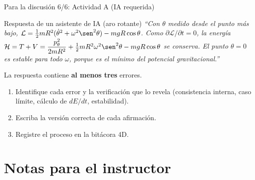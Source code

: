 \documentclass[spanish]{beamer}
\newif\ifinstructor
\newcommand{\Lag}{\mathcal{L}}               %
\newcommand{\Ham}{\mathcal{H}}               %
\begin{document}
\begin{frame}{Para la discusión 6/6: Actividad A (IA requerida)}
\begin{alertblock}{Respuesta de un asistente de IA (aro rotante)}
\small
\textit{“Con $\theta$ medido desde el punto más bajo,
$\Lag=\tfrac12 mR^2(\dot\theta^2+\omega^2\sen^2\theta)-mgR\cos\theta$.
Como $\partial\Lag/\partial t=0$, la energía
$\Ham=T+V=\dfrac{p_\theta^2}{2mR^2}+\tfrac12 mR^2\omega^2\sen^2\theta-mgR\cos\theta$
se conserva. El punto $\theta=0$ es estable para todo $\omega$, porque es el mínimo del
potencial gravitacional.”}
\end{alertblock}
\pause
La respuesta contiene \textbf{al menos tres} errores.
\begin{enumerate}[<+->]
  \item Identifique cada error y la verificación que lo revela
        (consistencia interna, caso límite, cálculo de $dE/dt$, estabilidad).
  \item Escriba la versión correcta de cada afirmación.
  \item Registre el proceso en la bitácora 4D.
\end{enumerate}
\end{frame}

\ifinstructor
\appendix
\section{Notas para el instructor}
\end{document}
